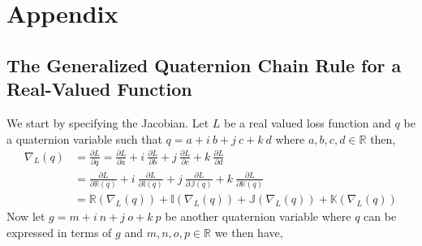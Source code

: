 \chapter{Appendix}
\section{The Generalized Quaternion Chain Rule for a Real-Valued Function}\label{a:diff}
We start by specifying the Jacobian.
Let $L$ be a real valued loss function and $q$ be a quaternion variable such that $q = a+\textit{i}~b+\textit{j}~c+\textit{k}~d$ where $a,b,c,d \in \mathbb{R}$ then,
\begin{align}
\nabla_L(q) &= \frac{\partial L}{\partial q} = \frac{\partial L}{\partial a} + \textit{i}~\frac{\partial L}{\partial b} + \textit{j}~\frac{\partial L}{\partial c} + \textit{k}~\frac{\partial L}{\partial d} \\ \nonumber
&= \frac{\partial L}{\partial \mathbb{R}(q)} + \textit{i}~\frac{\partial L}{\partial \mathbb{I}(q)} + \textit{j}~\frac{\partial L}{\partial \mathbb{J}(q)} + \textit{k}~\frac{\partial L}{\partial \mathbb{K}(q)} \\ \nonumber
&= \mathbb{R}(\nabla_L(q)) + \mathbb{I}(\nabla_L(q)) + \mathbb{J}(\nabla_L(q)) + \mathbb{K}(\nabla_L(q)) 
\label{eq:diff1}
\end{align}
Now let $g = m+\textit{i}~n+\textit{j}~o+\textit{k}~p$ be another quaternion variable where $q$ can be expressed in terms of $g$ and $m,n,o,p \in \mathbb{R}$ we then have,

